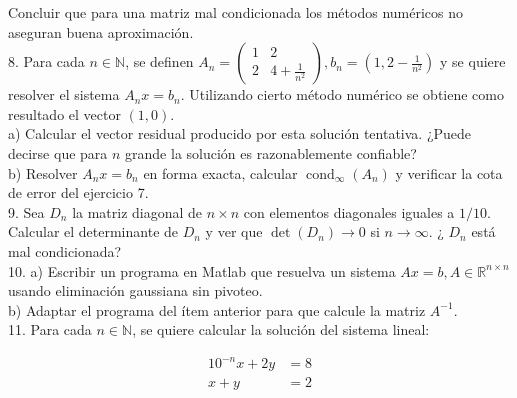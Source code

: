 \documentclass[10pt]{article}
\begin{document}
Concluir que para una matriz mal condicionada los métodos numéricos no aseguran buena aproximación.\\
8. Para cada $n \in \mathbb{N}$, se definen $A_{n}=\left(\begin{array}{cc}1 & 2 \\ 2 & 4+\frac{1}{n^{2}}\end{array}\right), b_{n}=\left(1,2-\frac{1}{n^{2}}\right)$ y se quiere resolver el sistema $A_{n} x=b_{n}$. Utilizando cierto método numérico se obtiene como resultado el vector $(1,0)$.\\
a) Calcular el vector residual producido por esta solución tentativa. ¿Puede decirse que para $n$ grande la solución es razonablemente confiable?\\
b) Resolver $A_{n} x=b_{n}$ en forma exacta, calcular $\operatorname{cond}_{\infty}\left(A_{n}\right)$ y verificar la cota de error del ejercicio 7.\\
9. Sea $D_{n}$ la matriz diagonal de $n \times n$ con elementos diagonales iguales a $1 / 10$. Calcular el determinante de $D_{n}$ y ver que $\operatorname{det}\left(D_{n}\right) \rightarrow 0$ si $n \rightarrow \infty$. ¿ $D_{n}$ está mal condicionada?\\
10. a) Escribir un programa en Matlab que resuelva un sistema $A x=b, A \in \mathbb{R}^{n \times n}$ usando eliminación gaussiana sin pivoteo.\\
b) Adaptar el programa del ítem anterior para que calcule la matriz $A^{-1}$.\\
11. Para cada $n \in \mathbb{N}$, se quiere calcular la solución del sistema lineal:

$$
\begin{aligned}
10^{-n} x+2 y & =8 \\
x+y & =2
\end{aligned}
$$
\end{document}
